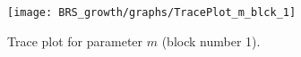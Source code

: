 \begin{figure}[H]
\centering
  \texttt{[image: BRS\_growth/graphs/TracePlot\_m\_blck\_1]}\\
    \caption{Trace plot for parameter ${m}$ (block number 1).}
\end{figure}
